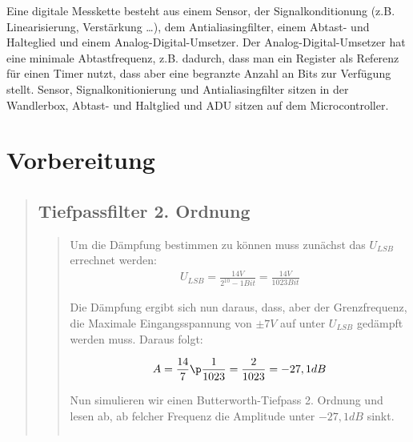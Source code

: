 \bq

Eine digitale Messkette besteht aus einem Sensor, der Signalkonditionung (z.B.
Linearisierung, Verstärkung \ldots), dem Antialiasingfilter, einem Abtast- und
Halteglied und einem Analog-Digital-Umsetzer.
Der Analog-Digital-Umsetzer hat eine minimale Abtastfrequenz, z.B. dadurch, dass
man ein Register als Referenz für einen Timer nutzt, dass aber eine begranzte
Anzahl an Bits zur Verfügung stellt.
Sensor, Signalkonitionierung und Antialiasingfilter sitzen in der Wandlerbox,
Abtast- und Haltglied und ADU sitzen auf dem Microcontroller.
\eq

\section{Vorbereitung}
\begin{quote}
    
    \subsection{Tiefpassfilter 2. Ordnung}
    \begin{quote}
        
        Um die Dämpfung bestimmen zu können muss zunächst das $U_{LSB}$ errechnet werden:
        \begin{equation}
    	\begin{split}
    		U_{LSB} = \frac{14V}{2^{10} - 1 Bit} = \frac{14V}{1023 Bit}
    	\end{split}
        \end{equation}
        
        Die Dämpfung ergibt sich nun daraus, dass, aber der Grenzfrequenz, die Maximale Eingangsspannung von $\pm 7V$ auf unter $U_{LSB}$ gedämpft
        werden muss.
        Daraus folgt:
        
        
        \begin{equation}
    	\begin{split}
    		A = \frac{14}{7} \p \frac{1}{1023} = \frac{2}{1023} = -27,1 dB
    	\end{split}
        \end{equation}
        
        
        Nun simulieren wir einen Butterworth-Tiefpass 2. Ordnung und lesen ab, ab felcher Frequenz die Amplitude unter $-27,1 dB$ sinkt.
        
        \begin{center}
        \vspace{-1.5cm}
        \begin{tabular}{ll}
        

\end{tabular}
\end{center}
\end{quote}
\end{quote}
